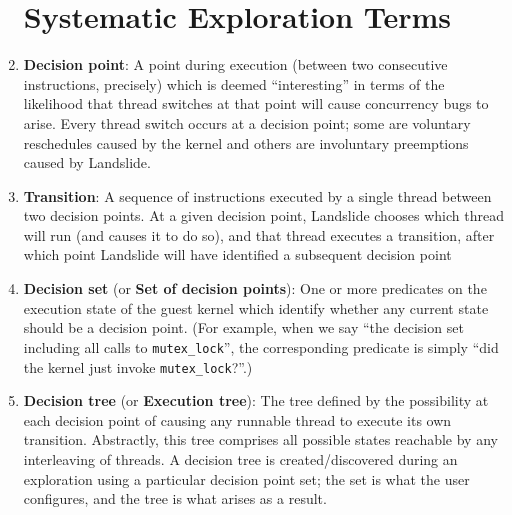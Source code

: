 \begin{enumerate}
\section{Systematic Exploration Terms}


	\item {\bf Decision point}:
		A point during execution (between two consecutive instructions, precisely) which is deemed ``interesting'' in terms of the likelihood that thread switches at that point will cause concurrency bugs to arise. Every thread switch occurs at a decision point; some are voluntary reschedules caused by the kernel and others are involuntary preemptions caused by Landslide.
	\item {\bf Transition}:
		A sequence of instructions executed by a single thread between two decision points. At a given decision point, Landslide chooses which thread will run (and causes it to do so), and that thread executes a transition, after which point Landslide will have identified a subsequent decision point
	\item {\bf Decision set} (or {\bf Set of decision points}):
		One or more predicates on the execution state of the guest kernel which identify whether any current state should be a decision point. (For example, when we say ``the decision set including all calls to \texttt{mutex\_lock}'', the corresponding predicate is simply ``did the kernel just invoke \texttt{mutex\_lock}?''.)
	\item {\bf Decision tree} (or {\bf Execution tree}):
		The tree defined by the possibility at each decision point of causing any runnable thread to execute its own transition. Abstractly, this tree comprises all possible states reachable by any interleaving of threads.
		A decision tree is created/discovered during an exploration using a particular decision point set; the set is what the user configures, and the tree is what arises as a result.


\end{enumerate}
